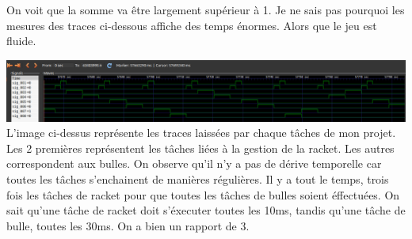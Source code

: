 \documentclass{report}
\begin{document}
On voit que la somme va être largement supérieur à 1. Je ne sais pas pourquoi les mesures des traces ci-dessous affiche des temps énormes. Alors que le jeu est fluide.

\includegraphics[scale=0.25]{images/traces.png}\\
L'image ci-dessus représente les traces laissées par chaque tâches de mon projet. Les 2 premières représentent les tâches liées à la gestion de la racket. Les autres correspondent aux bulles. On observe qu'il n'y a pas de dérive temporelle car toutes les tâches s'enchainent de manières régulières. Il y a tout le temps, trois fois les tâches de racket pour que toutes les tâches de bulles soient éffectuées. On sait qu'une tâche de racket doit s'éxecuter toutes les 10ms, tandis qu'une tâche de bulle, toutes les 30ms. On a bien un rapport de 3.
\end{document}
